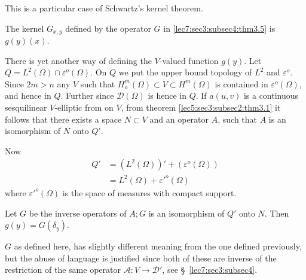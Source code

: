This is a particular case of Schwartz's kernel theorem.

The kernel $G_{x,y}$ defined by the operator $G$ in \ref{lec7:sec3:subsec4:thm3.5} is $g(y) (x)$. 

There is yet another way of defining the $V$-valued function $g(y)$. Let
$Q = L^2 (\Omega) \cap \varepsilon^o (\Omega)$. On $Q$ we put the upper bound
topology of $L^2$ and $\varepsilon^o$. Since $2m >n$ any $V$ such that $H^m_o
(\Omega) \subset V \subset H^m (\Omega)$ is contained in $\varepsilon^o
(\Omega)$, and hence in $Q$. Further since $\mathscr{D} (\Omega)$ is
hence in $Q$. If $a (u , v)$ is a continuous sesquilinear $V$-elliptic
from on $V$, from theorem \ref{lec5:sec3:subsec2:thm3.1} it follows that there exists a space $N
\subset V$ and an operator $A$, such that $A$ is an isomorphism of $N$
onto $Q'$. 

Now\pageoriginale
\begin{align*}
  Q' & = (L^2 (\Omega))' + (\varepsilon^o (\Omega))\\
  & = L^2 (\Omega ) + \varepsilon'^o (\Omega)
\end{align*}
where $\varepsilon'^o (\Omega)$ is the space of measures with compact support. 

Let $G$ be the inverse operators of $A; G$ is an isomorphism of $Q'$
onto $N$. Then $g(y) = G (\delta_y)$. 

\begin{remark*}
  $G$ as defined here, has slightly different meaning from the one
  defined previously, but the abuse of language is justified since
  both of these are inverse of the restriction of the same operator
  $\mathscr{A}: V \to \mathscr{D}'$, see \S\ \ref{lec7:sec3:subsec4}. 
\end{remark*}
